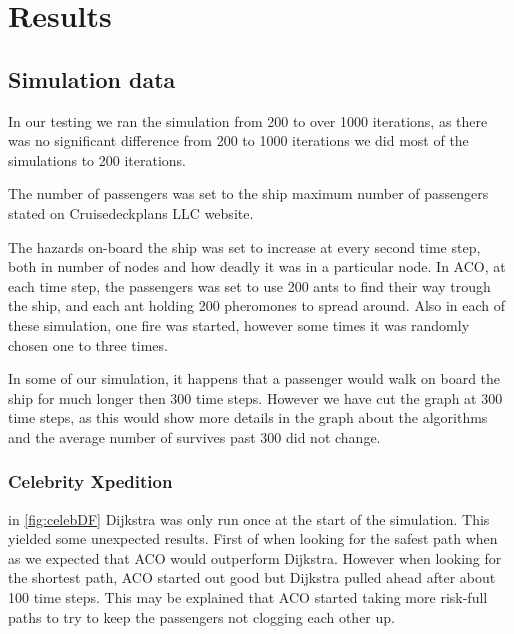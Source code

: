 \chapter{Results}
\label{ch:testing}

\section{Simulation data}
In our testing we ran the simulation from 200 to over 1000 iterations, as there was no significant difference from 200 to 1000 iterations we did most of the simulations to 200 iterations.

The number of passengers was set to the ship maximum number of passengers stated on Cruisedeckplans LLC\cite{cruseships} website.

The hazards on-board the ship was set to increase at every second time step, both in number of nodes and how deadly it was in a particular node. In ACO, at each time step, the passengers was set to use 200 ants to find their way trough the ship, and each ant holding 200 pheromones to spread around. Also in each of these simulation, one fire was started, however some times it was randomly chosen one to three times.

In some of our simulation, it happens that a passenger would walk on board the ship for much longer then 300 time steps. However we have cut the graph at 300 time steps, as this would show more details in the graph about the algorithms and the average number of survives past 300 did not change.


\subsection{Celebrity Xpedition}


in \ref{fig:celebDF} Dijkstra was only run once at the start of the simulation. This yielded some unexpected results. First of when looking for the safest path when as we expected that ACO would outperform Dijkstra. However when looking for the shortest path, ACO started out good but Dijkstra pulled ahead after about 100 time steps. This may be explained that ACO started taking more risk-full paths to try to keep the passengers not clogging each other up.


